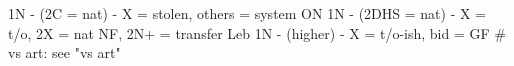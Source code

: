 1N - (2C = nat) - X = stolen, others = system ON
1N - (2DHS = nat) - X = t/o, 2X = nat NF, 2N+ = transfer Leb
1N - (higher) - X = t/o-ish, bid = GF
# vs art: see "vs art"